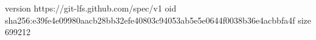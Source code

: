 version https://git-lfs.github.com/spec/v1
oid sha256:e39fe4e09980aacb28bb32efe40803c94053ab5e5e0644f0038b36e4acbbfa4f
size 699212
